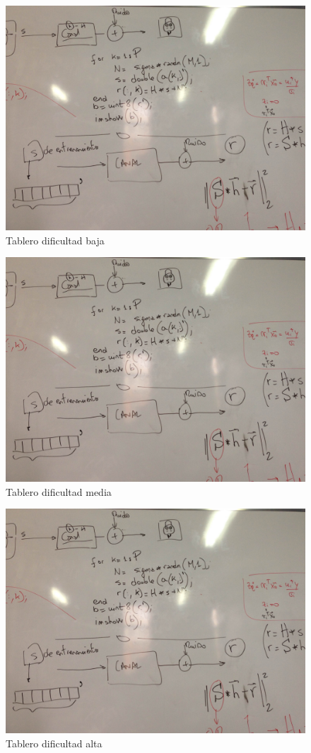 \documentclass[10pt,journal,compsoc]{IEEEtran}
\begin{document}
\begin{figure}[hp]
\centering
\includegraphics[scale=0.4]{photo1.jpg}
\caption{Tablero dificultad baja}
\label{board1}
\end{figure}

\begin{figure}[hp]
\centering
\includegraphics[scale=0.4]{photo1.jpg}
\caption{Tablero dificultad media}
\label{board2}
\end{figure}

\begin{figure}[hp]
\centering
\includegraphics[scale=0.4]{photo1.jpg}
\caption{Tablero dificultad alta}
\label{board3}
\end{figure}
\end{document}
